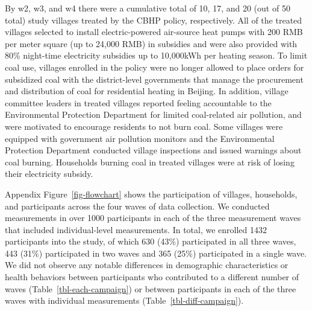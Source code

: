 \documentclass[
  letterpaper,
  DIV=11,
  numbers=noendperiod]{scrartcl}
\begin{document}
By w2, w3, and w4 there were a cumulative total of 10, 17, and 20 (out
of 50 total) study villages treated by the CBHP policy, respectively.
All of the treated villages selected to install electric-powered
air-source heat pumps with 200 RMB per meter square (up to 24,000 RMB)
in subsidies and were also provided with 80\% night-time electricity
subsidies up to 10,000kWh per heating season. To limit coal use,
villages enrolled in the policy were no longer allowed to place orders
for subsidized coal with the district-level governments that manage the
procurement and distribution of coal for residential heating in Beijing.
In addition, village committee leaders in treated villages reported
feeling accountable to the Environmental Protection Department for
limited coal-related air pollution, and were motivated to encourage
residents to not burn coal. Some villages were equipped with government
air pollution monitors and the Environmental Protection Department
conducted village inspections and issued warnings about coal burning.
Households burning coal in treated villages were at risk of losing their
electricity subsidy.

Appendix Figure~\ref{fig-flowchart} shows the participation of villages,
households, and participants across the four waves of data collection.
We conducted measurements in over 1000 participants in each of the three
measurement waves that included individual-level measurements. In total,
we enrolled 1432 participants into the study, of which 630 (43\%)
participated in all three waves, 443 (31\%) participated in two waves
and 365 (25\%) participated in a single wave. We did not observe any
notable differences in demographic characteristics or health behaviors
between participants who contributed to a different number of waves
(Table~\ref{tbl-each-campaign}) or between participants in each of the
three waves with individual measurements
(Table~\ref{tbl-diff-campaign}).
\end{document}
